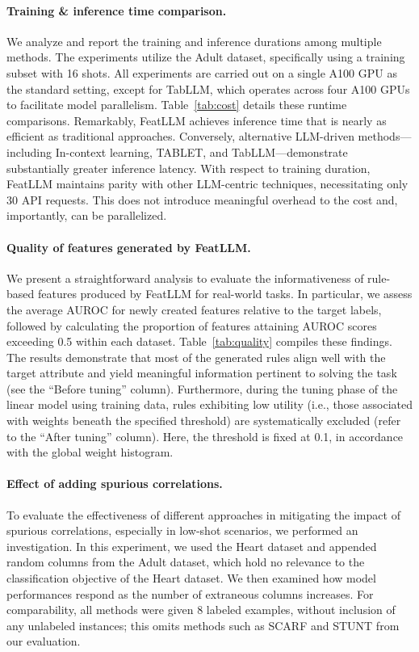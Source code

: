 \vspace*{-0.12in}
\paragraph{Training \& inference time comparison.} We analyze and report the training and inference durations among multiple methods. The experiments utilize the Adult dataset, specifically using a training subset with 16 shots. All experiments are carried out on a single A100 GPU as the standard setting, except for TabLLM, which operates across four A100 GPUs to facilitate model parallelism. Table~\ref{tab:cost} details these runtime comparisons. Remarkably, \textsf{FeatLLM} achieves inference time that is nearly as efficient as traditional approaches. Conversely, alternative LLM-driven methods—including In-context learning, TABLET, and TabLLM—demonstrate substantially greater inference latency. With respect to training duration, \textsf{FeatLLM} maintains parity with other LLM-centric techniques, necessitating only 30 API requests. This does not introduce meaningful overhead to the cost and, importantly, can be parallelized.

\vspace*{-0.12in}
\paragraph{Quality of features generated by \textsf{FeatLLM}.}
We present a straightforward analysis to evaluate the informativeness of rule-based features produced by \textsf{FeatLLM} for real-world tasks. In particular, we assess the average AUROC for newly created features relative to the target labels, followed by calculating the proportion of features attaining AUROC scores exceeding 0.5 within each dataset. Table~\ref{tab:quality} compiles these findings. The results demonstrate that most of the generated rules align well with the target attribute and yield meaningful information pertinent to solving the task (see the ``Before tuning'' column). Furthermore, during the tuning phase of the linear model using training data, rules exhibiting low utility (i.e., those associated with weights beneath the specified threshold) are systematically excluded (refer to the ``After tuning'' column). Here, the threshold is fixed at 0.1, in accordance with the global weight histogram.

\vspace*{-0.12in}
\paragraph{Effect of adding spurious correlations.} To evaluate the effectiveness of different approaches in mitigating the impact of spurious correlations, especially in low-shot scenarios, we performed an investigation. In this experiment, we used the Heart dataset and appended random columns from the Adult dataset, which hold no relevance to the classification objective of the Heart dataset. We then examined how model performances respond as the number of extraneous columns increases. For comparability, all methods were given 8 labeled examples, without inclusion of any unlabeled instances; this omits methods such as SCARF and STUNT from our evaluation. 

